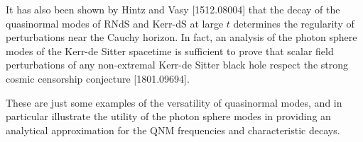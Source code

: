 \documentclass{tufte-handout}
\makeatletter
\newcommand{\?}{\overset{?}{=}}
\theoremstyle{definition}
\newtheorem{ex}{Exercise}
\theoremstyle{remark}
\DeclarePairedDelimiter\paren{(}{)}
\let\oldparen\paren
\def\paren{\@ifstar{\oldparen}{\oldparen*}}
\makeatother
\begin{document}
It has also been shown by Hintz and Vasy [1512.08004] that the decay of the quasinormal modes of RNdS and Kerr-dS at large $t$ determines the regularity of perturbations near the Cauchy horizon. In fact, an analysis of the photon sphere modes of the Kerr-de Sitter spacetime is sufficient to prove that scalar field perturbations of any non-extremal Kerr-de Sitter black hole respect the strong cosmic censorship conjecture [1801.09694].

These are just some examples of the versatility of quasinormal modes, and in particular illustrate the utility of the photon sphere modes in providing an analytical approximation for the QNM frequencies and characteristic decays.
\end{document}
